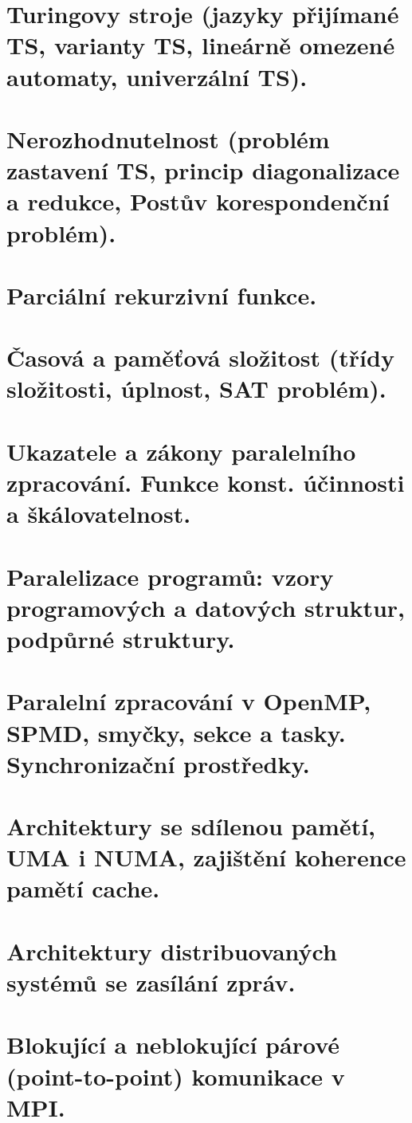 \documentclass[a4paper, 11pt]{report}
\begin{document}
\chapter{Turingovy stroje (jazyky přijímané TS, varianty TS, lineárně omezené automaty, univerzální TS).} \label{cha:22}
\chapter{Nerozhodnutelnost (problém zastavení TS, princip diagonalizace a redukce, Postův korespondenční problém).} \label{cha:23}
\chapter{Parciální rekurzivní funkce.} \label{cha:24}
\chapter{Časová a paměťová složitost (třídy složitosti, úplnost, SAT problém).} \label{cha:25}
\chapter{Ukazatele a zákony paralelního zpracování. Funkce konst. účinnosti a škálovatelnost.} \label{cha:26}
\chapter{Paralelizace programů: vzory programových a datových struktur, podpůrné struktury.} \label{cha:27}
\chapter{Paralelní zpracování v OpenMP, SPMD, smyčky, sekce a tasky. Synchronizační prostředky.} \label{cha:28}
\chapter{Architektury se sdílenou pamětí, UMA i NUMA, zajištění koherence pamětí cache.} \label{cha:29}
\chapter{Architektury distribuovaných systémů se zasílání zpráv.} \label{cha:30}
\chapter{Blokující a neblokující párové (point-to-point) komunikace v MPI.} \label{cha:31}
\end{document}
